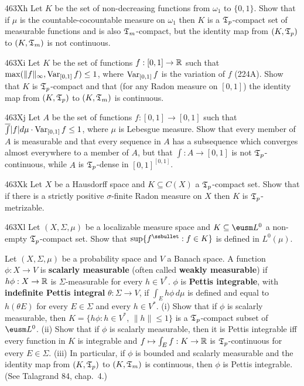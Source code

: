 {\sqheader 463Xh Let $K$ be the set of non-decreasing functions from
$\omega_1$ to $\{0,1\}$.
Show that if $\mu$ is
the countable-cocountable measure on $\omega_1$ then $K$ is a
$\frak T_p$-compact set of measurable functions and is also
$\frak T_m$-compact, but the identity map from $(K,\frak T_p)$ to
$(K,\frak T_m)$ is not continuous.

\sqheader 463Xi Let $K$ be the set of functions $f:[0,1]\to\Bbb R$ such
that $\max(\|f\|_{\infty},\mathop{\text{Var}}_{[0,1]}f)\le 1$, where $\mathop{\text{Var}}_{[0,1]}f$ is
the variation
of $f$ (224A).   Show that $K$ is $\frak T_p$-compact and that (for any
Radon measure on $[0,1]$) the identity map from $(K,\frak T_p)$  to
$(K,\frak T_m)$ is continuous.

\sqheader 463Xj Let $A$ be the set of functions $f:[0,1]\to[0,1]$ such
that $\overline{\int}|f|d\mu\cdot\mathop{\text{Var}}_{[0,1]}f\le 1$, where $\mu$ is
Lebesgue measure.   Show that every member of $A$ is measurable and that
every sequence in $A$ has a subsequence
which converges almost everywhere to a member of $A$, but that
$\int:A\to[0,1]$ is not $\frak T_p$-continuous, while $A$ is
$\frak T_p$-dense in $[0,1]^{[0,1]}$.

\spheader 463Xk Let $X$ be a Hausdorff space and $K\subseteq C(X)$ a
$\frak T_p$-compact set.   Show that if there is a strictly positive
$\sigma$-finite Radon measure on $X$ then $K$ is $\frak T_p$-metrizable.

\spheader 463Xl Let $(X,\Sigma,\mu)$ be a localizable measure space and
$K\subseteq\eusm L^0$ a non-empty $\frak T_p$-compact set.
Show that $\sup\{f^{\ssbullet}:f\in K\}$ is defined in $L^0(\mu)$.

Let $(X,\Sigma,\mu)$ be a probability space and $V$ a Banach space.   A
function $\phi:X\to V$ is {\bf scalarly measurable} (often called {\bf
weakly measurable}) if
$h\phi:X\to\Bbb R$ is $\Sigma$-measurable for every $h\in V^*$.
$\phi$ is {\bf Pettis integrable}, with {\bf indefinite
Pettis integral} $\theta:\Sigma\to V$, if $\int_Eh\phi\,d\mu$ is defined
and equal to $h(\theta E)$ for every $E\in\Sigma$ and every $h\in V^*$.
(i) Show that if $\phi$ is
scalarly measurable, then $K=\{h\phi:h\in V^*$, $\|h\|\le 1\}$ is a
$\frak T_p$-compact subset of $\eusm L^0$.   (ii) Show that if
$\phi$ is scalarly measurable, then it is Pettis integrable iff every
function in $K$ is integrable and $f\mapsto\int_Ef:K\to\Bbb R$ is
$\frak T_p$-continuous for every $E\in\Sigma$.      (iii)
In particular, if $\phi$ is bounded and scalarly measurable and the
identity map from $(K,\frak T_p)$ to $(K,\frak T_m)$ is continuous, then
$\phi$ is Pettis integrable.   (See {\smc Talagrand 84}, chap.\ 4.)

}
